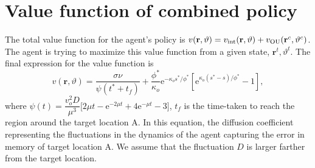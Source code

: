 \documentclass[%
reprint,
superscriptaddress,
floatfix,
amsmath,
amssymb,
aps,
notitlepage
]{revtex4-1}
\def\e{\text{e}}
\def\r{\mathbf{r}}
\def\th{\hat{\mathbf{t}}}
\def\theta{\vartheta}
\begin{document}
\section{Value function of combined policy}
The total value function for the agent's policy is $v(\r, \theta) = v_{\rm int}(\r, \theta) + v_{\rm OU}(\r^c, \theta^c)$.
The agent is trying to maximize this value function from a given state, $\r^t, \theta^t$. The final expression
for the value function is
\[
    v(\r, \theta) = \frac{\sigma \nu}{\psi(t^*+t_f)} + \frac{\phi^*}{\kappa_o} \e^{-\kappa_o s^*/\phi^*} [ \e^{\kappa_o(s^*-s)/\phi^*} - 1],
\]
where $\psi(t) = \dfrac{v_o^2 D}{\mu^3} \bigg[ 2 \mu t - \e^{-2 \mu t} + 4 \e^{-\mu t} - 3 \bigg]$, $t_f$ is the time-taken to reach
the region around the target location A. In this equation, the diffusion coefficient
representing the fluctuations in the dynamics of the agent capturing the error in memory
of target location A. We assume that the fluctuation $D$ is larger farther from the target location.


\end{document}
